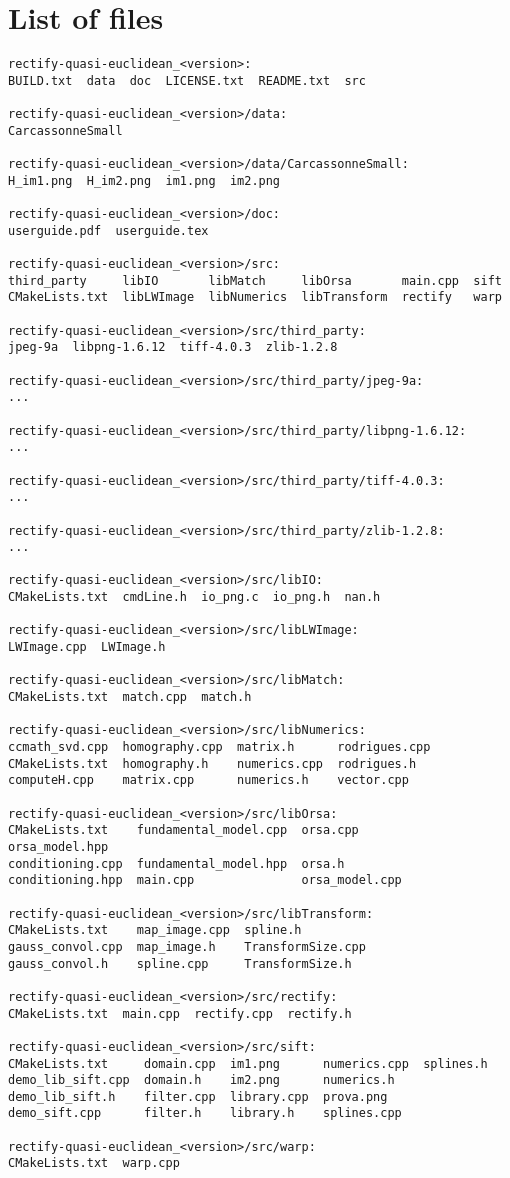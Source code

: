 \documentclass[a4paper]{article}
\begin{document}
\section*{List of files}
\begin{verbatim}
rectify-quasi-euclidean_<version>:
BUILD.txt  data  doc  LICENSE.txt  README.txt  src

rectify-quasi-euclidean_<version>/data:
CarcassonneSmall

rectify-quasi-euclidean_<version>/data/CarcassonneSmall:
H_im1.png  H_im2.png  im1.png  im2.png

rectify-quasi-euclidean_<version>/doc:
userguide.pdf  userguide.tex

rectify-quasi-euclidean_<version>/src:
third_party     libIO       libMatch     libOrsa       main.cpp  sift
CMakeLists.txt  libLWImage  libNumerics  libTransform  rectify   warp

rectify-quasi-euclidean_<version>/src/third_party:
jpeg-9a  libpng-1.6.12  tiff-4.0.3  zlib-1.2.8

rectify-quasi-euclidean_<version>/src/third_party/jpeg-9a:
...

rectify-quasi-euclidean_<version>/src/third_party/libpng-1.6.12:
...

rectify-quasi-euclidean_<version>/src/third_party/tiff-4.0.3:
...

rectify-quasi-euclidean_<version>/src/third_party/zlib-1.2.8:
...

rectify-quasi-euclidean_<version>/src/libIO:
CMakeLists.txt  cmdLine.h  io_png.c  io_png.h  nan.h

rectify-quasi-euclidean_<version>/src/libLWImage:
LWImage.cpp  LWImage.h

rectify-quasi-euclidean_<version>/src/libMatch:
CMakeLists.txt  match.cpp  match.h

rectify-quasi-euclidean_<version>/src/libNumerics:
ccmath_svd.cpp  homography.cpp  matrix.h      rodrigues.cpp
CMakeLists.txt  homography.h    numerics.cpp  rodrigues.h
computeH.cpp    matrix.cpp      numerics.h    vector.cpp

rectify-quasi-euclidean_<version>/src/libOrsa:
CMakeLists.txt    fundamental_model.cpp  orsa.cpp        orsa_model.hpp
conditioning.cpp  fundamental_model.hpp  orsa.h
conditioning.hpp  main.cpp               orsa_model.cpp

rectify-quasi-euclidean_<version>/src/libTransform:
CMakeLists.txt    map_image.cpp  spline.h
gauss_convol.cpp  map_image.h    TransformSize.cpp
gauss_convol.h    spline.cpp     TransformSize.h

rectify-quasi-euclidean_<version>/src/rectify:
CMakeLists.txt  main.cpp  rectify.cpp  rectify.h

rectify-quasi-euclidean_<version>/src/sift:
CMakeLists.txt     domain.cpp  im1.png      numerics.cpp  splines.h
demo_lib_sift.cpp  domain.h    im2.png      numerics.h
demo_lib_sift.h    filter.cpp  library.cpp  prova.png
demo_sift.cpp      filter.h    library.h    splines.cpp

rectify-quasi-euclidean_<version>/src/warp:
CMakeLists.txt  warp.cpp
\end{verbatim}
\end{document}
